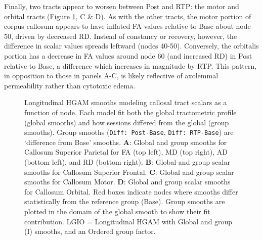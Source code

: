 \documentclass[12pt]{article}
\begin{document}
Finally, two tracts appear to worsen between Post and RTP: the motor and orbital tracts (Figure \ref{fig:lgio-gam-cc}, C \& D). As with the other tracts, the motor portion of corpus callosum appears to have inflated FA values relative to Base about node 50, driven by decreased RD. Instead of constancy or recovery, however, the difference in scalar values spreads leftward (nodes 40-50). Conversely, the orbitalis portion has a decrease in FA values around node 60 (and increased RD) in Post relative to Base, a difference which increases in magnitude by RTP. This pattern, in opposition to those in panels A-C, is likely reflective of axolemmal permeability rather than cytotoxic edema.

\begin{figure}[H]
	\centering
	\caption{Longitudinal HGAM smooths modeling callosal tract scalars as a function of node. Each model fit both the global tractometric profile (global smooths) and how sessions differed from the global (group smooths). Group smooths (\lstinline{Diff: Post-Base}, \lstinline{Diff: RTP-Base}) are `difference from Base' smooths. \textbf{A}: Global and group smooths for Callosum Superior Parietal for FA (top left), MD (top right), AD (bottom left), and RD (bottom right). \textbf{B}: Global and group scalar smooths for Callosum Superior Frontal. \textbf{C}: Global and group scalar smooths for Callosum Motor. \textbf{D}: Global and group scalar smooths for Callosum Orbital. Red boxes indicate nodes where smooths differ statistically from the reference group (Base). Group smooths are plotted in the domain of the global smooth to show their fit contribution. LGIO = Longitudinal HGAM with Global and group (I) smooths, and an Ordered group factor.}
	\label{fig:lgio-gam-cc}
\end{figure}
\end{document}
